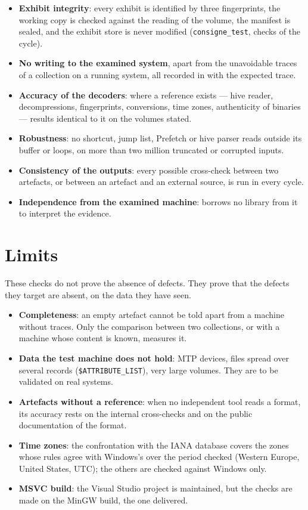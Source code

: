 \documentclass[11pt,a4paper,oneside]{report}
\begin{document}
\begin{itemize}
  \item \textbf{Exhibit integrity}: every exhibit is identified by three
    fingerprints, the working copy is checked against the reading of the
    volume, the manifest is sealed, and the exhibit store is never modified
    (\texttt{consigne\_test}, checks of the cycle).
  \item \textbf{No writing to the examined system}, apart from the unavoidable
    traces of a collection on a running system, all recorded in
     with the expected trace.
  \item \textbf{Accuracy of the decoders}: where a reference exists — hive
    reader, decompressions, fingerprints, conversions, time zones, authenticity
    of binaries — results identical to it on the volumes stated.
  \item \textbf{Robustness}: no shortcut, jump list, Prefetch or hive parser
    reads outside its buffer or loops, on more than two million truncated or
    corrupted inputs.
  \item \textbf{Consistency of the outputs}: every possible cross-check
    between two artefacts, or between an artefact and an external source, is
    run in every cycle.
  \item \textbf{Independence from the examined machine}: \wac{} borrows no
    library from it to interpret the evidence.
\end{itemize}

\section{Limits}

\begin{attention}
These checks do not prove the absence of defects. They prove that the defects
they target are absent, on the data they have seen.
\end{attention}

\begin{itemize}
  \item \textbf{Completeness}: an empty artefact cannot be told apart from a
    machine without traces. Only the comparison between two collections, or
    with a machine whose content is known, measures it.
  \item \textbf{Data the test machine does not hold}: MTP devices,
    files spread over several  records
    (\texttt{\$ATTRIBUTE\_LIST}), very large volumes. They are to be validated
    on real systems.
  \item \textbf{Artefacts without a reference}: when no independent tool reads
    a format, its accuracy rests on the internal cross-checks and on the public
    documentation of the format.
  \item \textbf{Time zones}: the confrontation with the IANA database covers
    the zones whose rules agree with Windows's over the period checked
    (Western Europe, United States, UTC); the others are checked against
    Windows only.
  \item \textbf{MSVC build}: the Visual Studio project is maintained, but the
    checks are made on the MinGW build, the one delivered.
\end{itemize}
\end{document}
